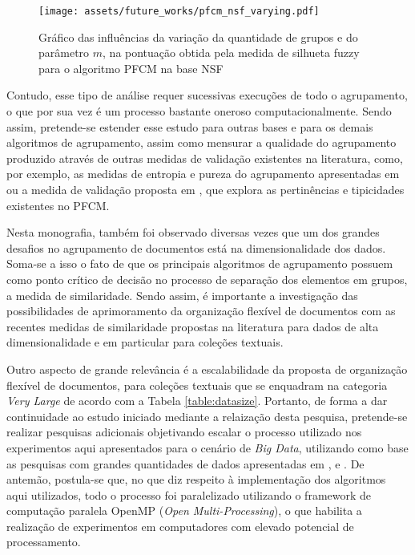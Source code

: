 \begin{figure}[!htb] \centering 
  \centering
  \texttt{[image: assets/future\_works/pfcm\_nsf\_varying.pdf]} 
  \caption{Gráfico das influências da variação da quantidade de grupos e do parâmetro $m$, na
pontuação obtida pela medida de silhueta fuzzy para o algoritmo PFCM na base NSF} 
  \label{fig:pfcmvarying}
\end{figure}

Contudo, esse tipo de análise requer
sucessivas execuções de todo o agrupamento, o que por sua vez é um processo bastante oneroso
computacionalmente. Sendo assim, pretende-se estender esse estudo para outras bases e para os
demais algoritmos de agrupamento, assim como mensurar a qualidade do agrupamento produzido
através de outras medidas de validação existentes na literatura, como, por exemplo, as medidas de
entropia e pureza do agrupamento apresentadas em  ou a medida de validação
proposta em , que explora as pertinências e tipicidades existentes no
PFCM.


Nesta monografia, também foi observado diversas vezes que um dos grandes desafios no agrupamento de
documentos está na dimensionalidade dos dados. Soma-se a isso o fato de que os principais algoritmos
de agrupamento possuem como ponto crítico de decisão no processo de separação dos elementos em
grupos, a medida de similaridade. Sendo assim, é importante a investigação das possibilidades de
aprimoramento da organização flexível de documentos com as recentes medidas de similaridade
propostas na literatura \cite{Lin2014,Nagwani2015} para dados de alta dimensionalidade e em
particular para coleções textuais.

Outro aspecto de grande relevância é a escalabilidade da proposta de organização flexível de
documentos, para coleções textuais que se enquadram na categoria {\it Very Large\/} de acordo com a
Tabela \ref{table:datasize}. Portanto, de forma a dar continuidade ao estudo iniciado mediante a relaização desta pesquisa, pretende-se realizar pesquisas adicionais objetivando escalar o processo
utilizado nos experimentos aqui apresentados para o cenário de {\it Big Data\/}, utilizando como base as pesquisas com
grandes quantidades de dados apresentadas em ,  e
. De antemão, postula-se que, no que diz respeito à implementação dos
algoritmos aqui utilizados, todo o processo foi paralelizado utilizando o framework de computação
paralela OpenMP ({\it Open Multi-Processing\/})\footnotemark, o que habilita a realização de
experimentos em computadores com elevado potencial de processamento.

